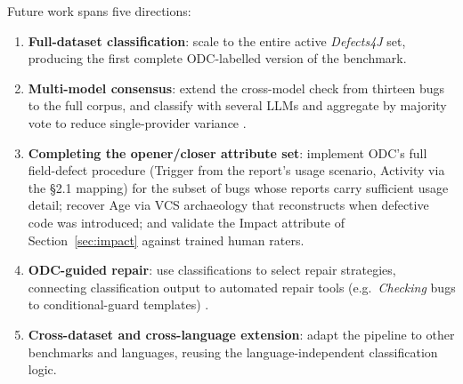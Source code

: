\smallskip
Future work spans five directions:
\begin{enumerate}
  \item \textbf{Full-dataset classification}: scale to the entire active
        \textit{Defects4J} set, producing the first complete ODC-labelled version
        of the benchmark.
  \item \textbf{Multi-model consensus}: extend the cross-model check from
        thirteen bugs to the full corpus, and classify with several LLMs and
        aggregate by majority vote to reduce single-provider variance
        \citep{colavito2024llm}.
  \item \textbf{Completing the opener/closer attribute set}: implement
        ODC's full field-defect procedure (Trigger from the report's usage
        scenario, Activity via the \S2.1 mapping) for the subset of bugs whose
        reports carry sufficient usage detail; recover Age via VCS archaeology
        that reconstructs when defective code was introduced; and validate the
        Impact attribute of Section~\ref{sec:impact} against trained human
        raters.
  \item \textbf{ODC-guided repair}: use classifications to select repair
        strategies, connecting classification output to automated repair tools
        (e.g.\ \textit{Checking} bugs to conditional-guard templates)
        \citep{durieux2018automatic}.
  \item \textbf{Cross-dataset and cross-language extension}: adapt the pipeline
        to other benchmarks and languages, reusing the language-independent
        classification logic.
\end{enumerate}

